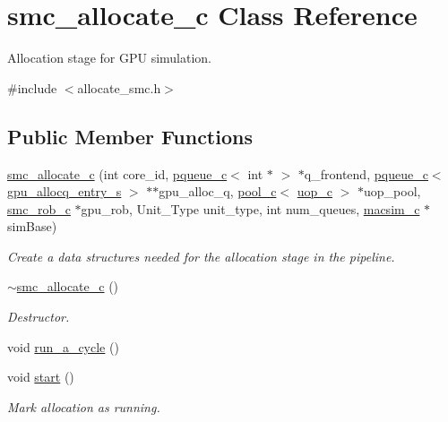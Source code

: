\hypertarget{classsmc__allocate__c}{
\section{smc\_\-allocate\_\-c Class Reference}
\label{classsmc__allocate__c}
}


Allocation stage for GPU simulation.  




{\ttfamily \#include $<$allocate\_\-smc.h$>$}

\subsection*{Public Member Functions}
\begin{DoxyCompactItemize}
\item 
\hyperlink{classsmc__allocate__c_afd008391634a752b54573173db52be11}{smc\_\-allocate\_\-c} (int core\_\-id, \hyperlink{classpqueue__c}{pqueue\_\-c}$<$ int $\ast$ $>$ $\ast$q\_\-frontend, \hyperlink{classpqueue__c}{pqueue\_\-c}$<$ \hyperlink{structgpu__allocq__entry__s}{gpu\_\-allocq\_\-entry\_\-s} $>$ $\ast$$\ast$gpu\_\-alloc\_\-q, \hyperlink{classpool__c}{pool\_\-c}$<$ \hyperlink{classuop__c}{uop\_\-c} $>$ $\ast$uop\_\-pool, \hyperlink{classsmc__rob__c}{smc\_\-rob\_\-c} $\ast$gpu\_\-rob, Unit\_\-Type unit\_\-type, int num\_\-queues, \hyperlink{classmacsim__c}{macsim\_\-c} $\ast$simBase)
\begin{DoxyCompactList}\small\item\em Create a data structures needed for the allocation stage in the pipeline. \item\end{DoxyCompactList}\item 
\hyperlink{classsmc__allocate__c_a58bf0515b7fe139787c1808f45a5f45a}{$\sim$smc\_\-allocate\_\-c} ()
\begin{DoxyCompactList}\small\item\em Destructor. \item\end{DoxyCompactList}\item 
void \hyperlink{classsmc__allocate__c_a127be98f456d4c2d30985e73e37cfd67}{run\_\-a\_\-cycle} ()
\item 
void \hyperlink{classsmc__allocate__c_a29566786181c9e5963324f2061d9982f}{start} ()
\begin{DoxyCompactList}\small\item\em Mark allocation as running. \item\end{DoxyCompactList}\item 
$$
\end{DoxyCompactItemize}
